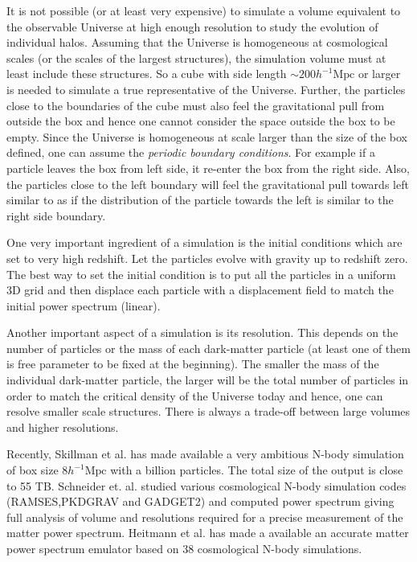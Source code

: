It is not possible (or at least very expensive) to simulate a volume equivalent to the
observable Universe at high enough resolution to study the evolution of individual
halos. Assuming that the Universe is homogeneous
at cosmological scales (or the scales of the largest structures), the simulation
volume must at least include these structures. So a cube with side length $\sim 200h^{-1} \mathrm{Mpc}$
or larger is needed to simulate a true representative of the Universe. Further, the
particles close to the boundaries of the cube must also feel the gravitational pull
from outside the box and hence one cannot consider the space outside the box to be 
empty. Since the Universe is homogeneous at scale larger than the size of the box defined, one
can assume the {\it periodic boundary conditions}. For example if a particle leaves the box from left
side, it re-enter the box from the right side. Also, the particles close to the left boundary
will feel the gravitational pull towards left similar to as if the distribution of the particle
towards the left is similar to the right side boundary.

One very important ingredient of a simulation is the initial conditions which are
set to very high redshift. Let the particles evolve with gravity up to redshift zero. 
The best way to set the initial condition is to put all the particles in a uniform 3D grid
and then displace each particle with a displacement field to match the initial power 
spectrum (linear). 

Another important aspect of a simulation is its resolution. This depends on the number of
particles or the mass of each dark-matter particle (at least one of them is free parameter 
to be fixed at the beginning). The smaller the mass of the individual dark-matter particle, the
larger will be the total number of particles in order to match the critical density of 
the Universe today and hence, one can resolve smaller scale structures. 
There is always a trade-off between large volumes and higher resolutions. 


Recently, Skillman et al. \cite{2014arXiv1407.2600S} has made available
a very ambitious N-body simulation of box size $8 h^{-1} \mathrm{Mpc}$ with
a billion particles. The total size of the output is close to 55 TB.
Schneider et. al. \cite{2015arXiv150305920S} studied various cosmological
N-body simulation codes (RAMSES,PKDGRAV and GADGET2) and computed power 
spectrum giving full analysis of volume and resolutions required for 
a precise measurement of the matter power spectrum.
Heitmann et al. \cite{2009ApJ...705..156H,2010ApJ...715..104H,
2010ApJ...713.1322L,2014ApJ...780..111H} has made a available an accurate matter power spectrum
emulator based on 38 cosmological N-body simulations. 

